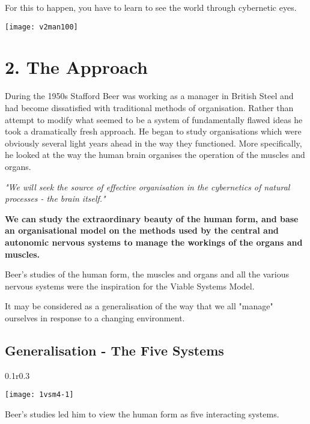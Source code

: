 For this to happen, you have to learn to see the world through cybernetic eyes.

\begin{center}
\texttt{[image: v2man100]}
\end{center}

\section*{2. The Approach}
During the 1950s Stafford Beer was working as a manager in British Steel and had become dissatisfied with traditional methods of organisation. Rather than attempt to modify what seemed to be a system of fundamentally flawed ideas he took a dramatically fresh approach. He began to study organisations which were obviously several light years ahead in the way they functioned. More specifically, he looked at the way the human brain organises the operation of the muscles and organs.

\textit{"We will seek the source of effective organisation in the cybernetics of natural processes - the brain itself."}

\textbf{We can study the extraordinary beauty of the human form, and base an organisational model on the methods used by the central and autonomic nervous systems to manage the workings of the organs and muscles.}

Beer's studies of the human form, the muscles and organs and all the various nervous systems were the inspiration for the Viable Systems Model.

It may be considered as a generalisation of the way that we all "manage" ourselves in response to a changing environment.


\subsection*{Generalisation - The Five Systems}

\begin{wrapfigure}{0.1r}{0.3\textwidth}
    \begin{center}
        \texttt{[image: 1vsm4-1]}
    \end{center}
\end{wrapfigure}
Beer's studies led him to view the human form as five interacting systems.

